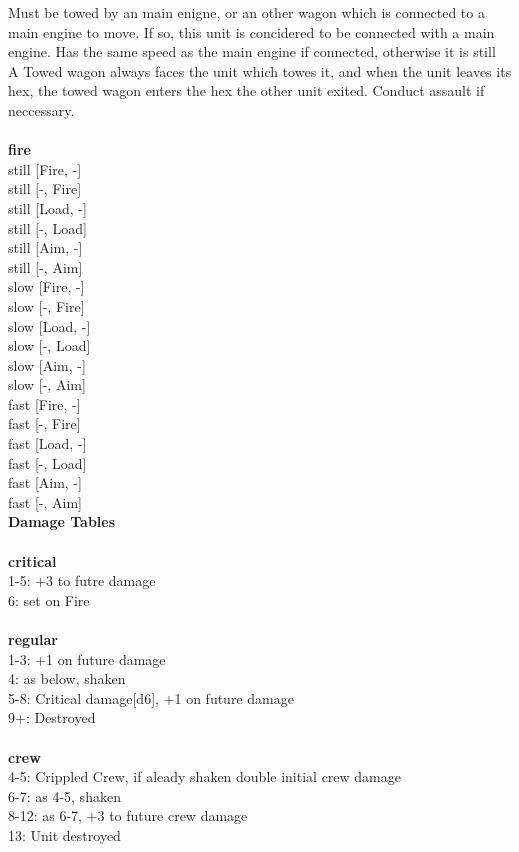 \noindent Must be towed by an main enigne, or an other wagon which is connected to a main engine to move. If so, this unit is concidered to be connected with a main engine. Has the same speed as the main engine if connected, otherwise it is still\\ 
A Towed wagon always faces the unit which towes it, and when the unit leaves its hex, the towed wagon enters the hex the other unit exited. Conduct assault if neccessary.\\ 


\ \\ {\bf fire } \\
still [Fire, -] \\
still [-, Fire] \\
still [Load, -] \\
still [-, Load] \\
still [Aim, -] \\
still [-, Aim] \\
slow [Fire, -] \\
slow [-, Fire] \\
slow [Load, -] \\
slow [-, Load] \\
slow [Aim, -] \\
slow [-, Aim] \\
fast [Fire, -] \\
fast [-, Fire] \\
fast [Load, -] \\
fast [-, Load] \\
fast [Aim, -] \\
fast [-, Aim] \\


{\bf Damage Tables} \\
\ \\ {\bf critical } \\
1-5: +3 to futre damage \\
6: set on Fire \\
\ \\ {\bf regular } \\
1-3: +1 on future damage \\
4: as below, shaken \\
5-8: Critical damage[d6], +1 on future damage \\
9+: Destroyed \\
\ \\ {\bf crew } \\
4-5: Crippled Crew, if aleady shaken double initial crew damage \\
6-7: as 4-5, shaken \\
8-12: as 6-7, +3 to future crew damage \\
13: Unit destroyed \\


